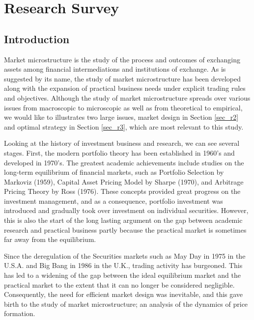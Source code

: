 
\chapter{Research Survey}\label{chap_r}

\section{Introduction}\label{sec_r1}
Market microstructure is the study of the process and outcomes of exchanging assets among financial intermediations and institutions of exchange.  As is suggested by its name, the study of market microstructure has been developed along with the expansion of practical business needs under explicit trading rules and objectives.  Although the study of market microstructure spreads over various issues from macroscopic to microscopic as well as from theoretical to empirical, we would like to illustrates two large issues, market design in Section \ref{sec_r2} and optimal strategy in Section \ref{sec_r3}, which are most relevant to this study.

Looking at the history of investment business and research, we can see several stages.  First, the modern portfolio theory has been established in 1960's and developed in 1970's.  The greatest academic achievements include studies on the long-term equilibrium of financial markets, such as Portfolio Selection by Markoviz (1959), Capital Asset Pricing Model by Sharpe (1970), and Arbitrage Pricing Theory by Ross (1976).  These concepts provided great progress on the investment management, and as a consequence, portfolio investment was introduced and gradually took over investment on individual securities.  However, this is also the start of the long lasting argument on the gap between academic research and practical business partly because the practical market is sometimes far away from the equilibrium.

Since the deregulation of the Securities markets such as May Day in 1975 in the U.S.A. and Big Bang in 1986 in the U.K., trading activity has burgeoned.  This has led to a widening of the gap between the ideal equilibrium market and the practical market to the extent that it can no longer be considered negligible.  Consequently, the need for efficient market design was inevitable, and this gave birth to the study of market microstructure; an analysis of the dynamics of price formation.


